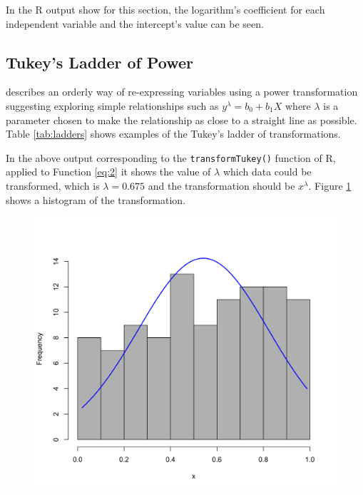 \documentclass[10pt,leter,openany]{article}
\begin{document}
		
		In the R output show for this section, the logarithm's coefficient for each independent variable and the intercept's value can be seen.
		
		\subsection{Tukey's Ladder of Power}
		
		\citet{tukey1977exploratory} describes an orderly way of re-expressing variables using a power transformation suggesting exploring simple relationships such as $ y^{\lambda} = b_{0} + b_{1}X $ where $\lambda$ is a parameter chosen to make the relationship as close to a straight line as possible. Table \ref{tab:ladders} shows examples of the Tukey's ladder of transformations.
		
			
			In the above output corresponding to the \texttt{transformTukey()} function of R, applied to Function \ref{eq:2} it shows the value of $\lambda$ which data could be transformed, which is $\lambda = 0.675$ and the transformation should be $x^\lambda$. Figure \ref{fig:tukey} shows a histogram of the transformation.
			
			\begin{figure}
				\begin{center}
					\includegraphics[scale=0.15]{extras/tukeyimg}
					\label{fig:tukey}
				\end{center}
			\end{figure}			
		
\end{document}
